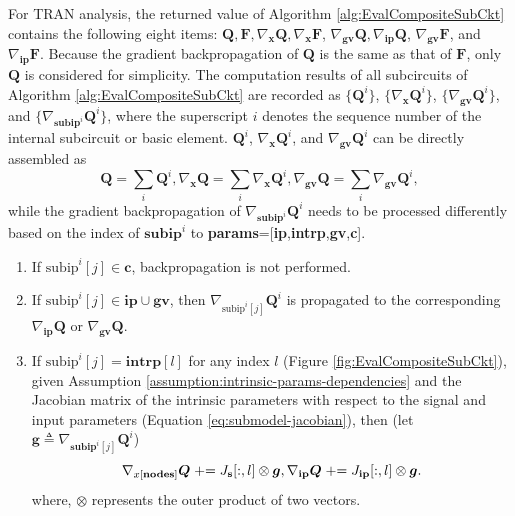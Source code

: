 For TRAN analysis, the returned value of Algorithm \ref{alg:EvalCompositeSubCkt} contains the following eight items:
$\bm{Q}, \bm{F}, \nabla_{\bm{x}}\bm{Q}, \nabla_{\bm{x}}\bm{F}$,
$\nabla_{\textbf{gv}}\bm{Q}, \nabla_{\textbf{ip}}\bm{Q}$,
$\nabla_{\textbf{gv}}\bm{F}$, and $\nabla_{\textbf{ip}}\bm{F}$.
Because the gradient backpropagation of $\bm{Q}$ is the same as that of $\bm{F}$, only $\bm{Q}$ is considered for simplicity.
The computation results of all subcircuits of Algorithm \ref{alg:EvalCompositeSubCkt} are recorded as $\{\bm{Q}^{i}\}$, $\{\nabla_{\bm{x}}\bm{Q}^{i}\}$, $\{\nabla_{\textbf{gv}}\bm{Q}^{i}\}$, and $\{\nabla_{\textbf{subip}^i}\bm{Q}^{i}\}$, where the superscript $i$ denotes the sequence number of the internal subcircuit or basic element. $\bm{Q}^{i}$, $\nabla_{\bm{x}}\bm{Q}^{i}$, and $\nabla_{\textbf{gv}}\bm{Q}^{i}$ can be directly assembled as
\[
\bm{Q} = \sum_i \bm{Q}^{i},
\nabla_{\bm{x}}\bm{Q} = \sum_i \nabla_{\bm{x}}\bm{Q}^{i},
\nabla_{\textbf{gv}}\bm{Q} = \sum_i \nabla_{\textbf{gv}}\bm{Q}^{i},
\]
while the gradient backpropagation of $\nabla_{\textbf{subip}^i}\bm{Q}^{i}$ needs to be processed differently based on the index of $\textbf{subip}^i$ to \textbf{params}=[\textbf{ip},\textbf{intrp},\textbf{gv},\textbf{c}].

\begin{enumerate}[partopsep=0pt,itemsep=0pt,parsep=0pt]
\item If $\text{subip}^i[j]\in\textbf{c}$, backpropagation is not performed.
\item If $\text{subip}^i[j]\in\textbf{ip}\cup\textbf{gv}$, then $\nabla_{\text{subip}^i[j]}\bm{Q}^i$ is propagated to the corresponding $\nabla_\textbf{ip}\bm{Q}$ or $\nabla_\textbf{gv}\bm{Q}$.
\item If $\text{subip}^i[j]=\textbf{intrp}[l]$ for any index $l$ (Figure \ref{fig:EvalCompositeSubCkt}), given Assumption \ref{assumption:intrinsic-params-dependencies} and the Jacobian matrix of the intrinsic parameters with respect to the signal and input parameters (Equation \ref{eq:submodel-jacobian}), then (let $\bm{g}\triangleq\nabla_{\textbf{subip}^i[j]}\bm{Q}^{i}$)
\vspace{-1em}
\begin{equation}\label{eq:intrinsic-params-backward}
\nabla_{x[\textbf{nodes}]}\bm{Q}\mathrel{+}=J_{\textbf{s}}[:,l]\otimes\bm{g},
\nabla_{\textbf{ip}}\bm{Q}\mathrel{+}=J_{\textbf{ip}}[:,l]\otimes\bm{g}.
\vspace{-1em}
\end{equation}
where, $\otimes$ represents the outer product of two vectors.
\end{enumerate}

